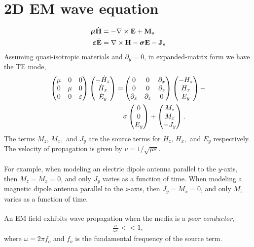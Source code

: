 \documentclass[a4paper,12pt]{article}
\begin{document}
	\section*{2D EM wave equation}
	\begin{align}
		\boldsymbol{\mu}\dot{{\bf H}} &= -\nabla\times{\bf E} + {\bf M}_s\\
		\boldsymbol{\varepsilon}\dot{{\bf E}} &= \nabla\times{\bf H} - \boldsymbol{\sigma}{\bf E} - {\bf J}_s
	\end{align}
	Assuming quasi-isotropic materials and $\partial_y=0$, in expanded-matrix form we have the TE mode,
	\begin{align}
		\begin{pmatrix} 
			\mu & 0 & 0\cr 
			0 & \mu & 0 \cr
			0 & 0 & \varepsilon
		\end{pmatrix}
		\begin{pmatrix} 
			-\dot{H}_z \cr
			\dot{H}_x \cr
			\dot{E}_y
		\end{pmatrix}
		=
		&
		\begin{pmatrix} 
			0 & 0 & \partial_x \cr 
			0 & 0 & \partial_z \cr
			\partial_x & \partial_z & 0
		\end{pmatrix}
		\begin{pmatrix} 
			-H_z \cr
			H_x \cr
			E_y
		\end{pmatrix}
		-\\
		&\sigma
		\begin{pmatrix} 
			0 \cr
			0 \cr
			E_y
		\end{pmatrix}
		+
		\begin{pmatrix} 
			M_z \cr
			M_x \cr
			-J_y
		\end{pmatrix}.
	\end{align}
	The terms $M_z,\,M_x,$ and $J_y$ are the source terms for $H_z,\,H_x,$ and $E_y$ respectively. The velocity of propagation is given by $v=1/\sqrt{\mu\varepsilon}$.
	\\\\
	For example, when modeling an electric dipole antenna parallel to the $y$-axis, then $M_z=M_x=0$, and only $J_y$ varies as a function of time. When modeling a magnetic dipole antenna parallel to the $z$-axis, then $J_y=M_x=0$, and only $M_z$ varies as a function of time.
	\\\\
	An EM field exhibits wave propagation when the media is a {\it poor conductor},
	\begin{align}
		\frac{\sigma}{\omega\varepsilon} << 1,
	\end{align}
	where $\omega=2\pi f_o$ and $f_o$ is the fundamental frequency of the source term.
\end{document}
